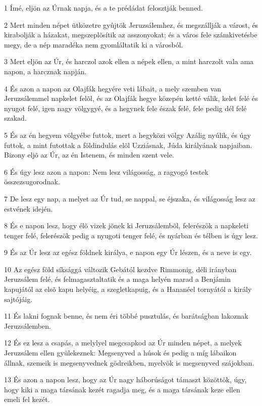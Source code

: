 \par 1 Ímé, eljön az Úrnak napja, és a te prédádat felosztják benned.
\par 2 Mert minden népet ütközetre gyûjtök Jeruzsálemhez, és megszállják a várost, és kirabolják a házakat, megszeplõsítik az asszonyokat; és a város fele számkivetésbe megy, de a nép maradéka nem gyomláltatik ki a városból.
\par 3 Mert eljön az Úr, és harczol azok ellen a népek ellen, a mint harczolt vala ama napon, a harcznak napján.
\par 4 És azon a napon az Olajfák hegyére veti lábait, a mely szemben van Jeruzsálemmel napkelet felõl, és az Olajfák hegye közepén ketté válik, kelet felé és nyugot felé, igen nagy völgygyé, és a hegynek fele észak felé, fele pedig dél felé szakad.
\par 5 És az én hegyem völgyébe futtok, mert a hegyközi völgy Azálig nyúlik, és úgy futtok, a mint futottak a földindulás elõl Uzziásnak, Júda királyának napjaiban. Bizony eljõ az Úr, az én Istenem, és minden szent vele.
\par 6 És úgy lesz azon a napon: Nem lesz világosság, a ragyogó testek összezsugorodnak.
\par 7 De lesz egy nap, a melyet az Úr tud, se nappal, se éjszaka, és világosság lesz az estvének idején.
\par 8 És e napon lesz, hogy élõ vizek jõnek ki Jeruzsálembõl, felerészök a napkeleti tenger felé, felerészök pedig a nyugoti tenger felé, és nyárban és télben is úgy lesz.
\par 9 És az Úr lesz az egész földnek királya, e napon egy Úr lészen, és a neve is egy.
\par 10 Az egész föld síksággá változik Gebától kezdve Rimmonig, déli irányban Jeruzsálem felé, és felmagasztaltatik és a maga helyén marad a Benjámin kapujától az elsõ kapu helyéig, a szegletkapuig, és a Hananéel tornyától a király sajtójáig.
\par 11 És lakni fognak benne, és nem éri többé pusztulás, és barátságban lakoznak Jeruzsálemben.
\par 12 És ez lesz a csapás, a melylyel megcsapkod az Úr minden népet, a melyek Jeruzsálem ellen gyülekeznek: Megsenyved a húsok és pedig a míg lábaikon állnak, szemeik is megsenyvednek gödreikben, myelvök is megsenyved szájokban.
\par 13 És azon a napon lesz, hogy az Úr nagy háborúságot támaszt közöttök, úgy, hogy kiki a maga társának kezét ragadja meg, és a maga társának keze ellen emeli fel kezét.
